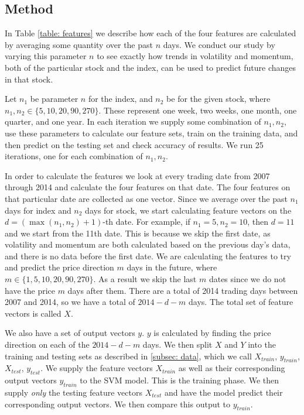 \documentclass[pageno]{jpaper}
\begin{document}
\subsection{Method}
In Table \ref{table: features} we describe how each of the four features are calculated by averaging some quantity over the past $n$ days. We conduct our study by varying this parameter $n$ to see exactly how trends in volatility and momentum, both of the particular stock and the index, can be used to predict future changes in that stock.

Let $n_1$ be parameter $n$ for the index, and $n_2$ be for the given stock, where $n_1, n_2 \in \{5, 10, 20, 90, 270\}$. These represent one week, two weeks, one month, one quarter, and one year. In each iteration we supply some combination of $n_1, n_2$, use these parameters to calculate our feature sets, train on the training data, and then predict on the testing set and check accuracy of results. We run 25 iterations, one for each combination of $n_1, n_2$.

In order to calculate the features we look at every trading date from 2007 through 2014 and calculate the four features on that date. The four features on that particular date are collected as one vector. Since we average over the past $n_1$ days for index and $n_2$ days for stock, we start calculating feature vectors on the $d = (\max(n_1, n_2) + 1)$-th date. For example, if $n_1 = 5, n_2 = 10$, then $d=11$ and we start from the 11th date. This is because we skip the first date, as volatility and momentum are both calculated based on the previous day's data, and there is no data before the first date. We are calculating the features to try and predict the price direction $m$ days in the future, where $m \in \{1, 5, 10, 20, 90, 270\}$. As a result we skip the last $m$ dates since we do not have the price $m$ days after them. There are a total of 2014 trading days between 2007 and 2014, so we have a total of $2014 - d - m$ days. The total set of feature vectors is called $X$.

We also have a set of output vectors $y$. $y$ is calculated by finding the price direction on each of the $2014-d-m$ days. We then split $X$ and $Y$ into the training and testing sets as described in \ref{subsec: data}, which we call $X_{train}$, $y_{train}$, $X_{test}$, $y_{test}$. We supply the feature vectors $X_{train}$ as well as their corresponding output vectors $y_{train}$ to the SVM model. This is the training phase. We then supply {\em only} the testing feature vectors $X_{test}$ and have the model predict their corresponding output vectors. We then compare this output to $y_{train}$.
\end{document}

